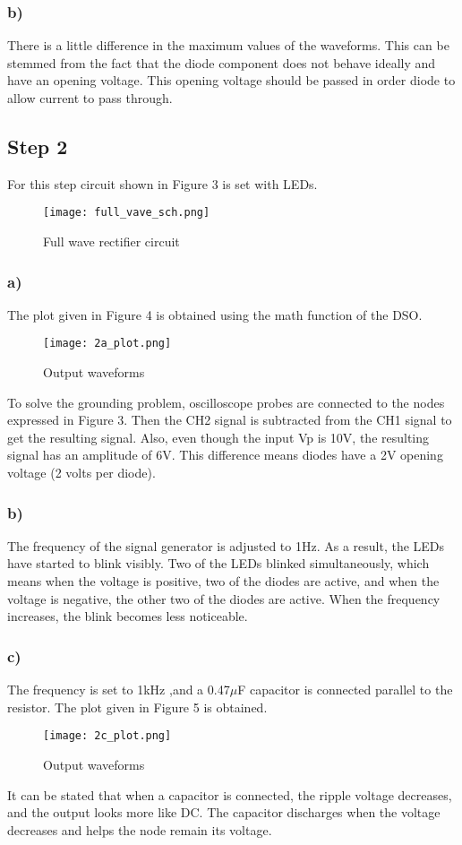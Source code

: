 \documentclass[letterpaper,12pt]{article}
\begin{document}
\subsubsection{b)}
There is a little difference in the maximum values of the waveforms. This can be stemmed from the fact that the diode component does not behave ideally and have an opening voltage. This opening voltage should be passed in order diode to allow current to pass through. 
\subsection{Step 2}
For this step circuit shown in Figure 3 is set with LEDs. 
\begin{figure}[H]
	\centering
   \texttt{[image: full\_vave\_sch.png]}
   \caption{Full wave rectifier circuit}
\end{figure}

\subsubsection{a)}
The plot given in Figure 4 is obtained using the math function of the DSO. 
\begin{figure}[H]
	\centering
   \texttt{[image: 2a\_plot.png]}
   \caption{Output waveforms}
\end{figure}
To solve the grounding problem, oscilloscope probes are connected to the nodes expressed in Figure 3. Then the CH2 signal is subtracted from the CH1 signal to get the resulting signal. Also, even though the input Vp is 10V, the resulting signal has an amplitude of 6V. This difference means diodes have a 2V opening voltage (2 volts per diode). 

\subsubsection{b)}
The frequency of the signal generator is adjusted to 1Hz. As a result, the LEDs have started to blink visibly. Two of the LEDs blinked simultaneously, which means when the voltage is positive, two of the diodes are active, and when the voltage is negative, the other two of the diodes are active. When the frequency increases, the blink becomes less noticeable.
\subsubsection{c)}
The frequency is set to 1kHz ,and a 0.47\(\mu\)F capacitor is connected parallel to the resistor. The plot given in Figure 5 is obtained.
\begin{figure}[H]
	\centering
   \texttt{[image: 2c\_plot.png]}
   \caption{Output waveforms}
\end{figure}
It can be stated that when a capacitor is connected, the ripple voltage decreases, and the output looks more like DC. The capacitor discharges when the voltage decreases and helps the node remain its voltage.
\end{document}

